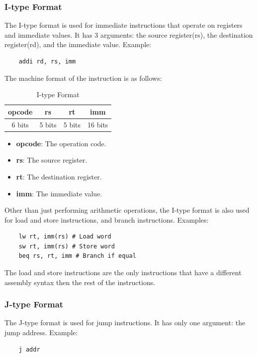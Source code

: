 \subsubsection{I-type Format}
The I-type format is used for immediate instructions that operate on registers and immediate values. It has 3 arguments: the source register(rs), the destination register(rd), and the immediate value. Example:
\begin{verbatim}
    addi rd, rs, imm
\end{verbatim}

The machine format of the instruction is as follows:
\begin{table}[H]
    \centering
    \begin{tabular}{|c|c|c|c|}
    \hline
    \textbf{opcode} & \textbf{rs} & \textbf{rt} & \textbf{imm} \\ \hline
    6 bits         & 5 bits     & 5 bits     & 16 bits     \\ \hline
    \end{tabular}
    \caption{I-type Format}
    \label{tab:i_type_format}
\end{table}

\begin{itemize}
    \item \textbf{opcode}: The operation code.
    \item \textbf{rs}: The source register.
    \item \textbf{rt}: The destination register.
    \item \textbf{imm}: The immediate value.
\end{itemize}
Other than just performing arithmetic operations, the I-type format is also used for load and store instructions, and branch instructions. \newline
Examples:
\begin{verbatim}
    lw rt, imm(rs) # Load word
    sw rt, imm(rs) # Store word
    beq rs, rt, imm # Branch if equal
\end{verbatim}
The load and store instructions are the only instructions that have a different assembly syntax then the rest of the instructions.

\subsubsection{J-type Format}
The J-type format is used for jump instructions. It has only one argument: the jump address. Example:
\begin{verbatim}
    j addr
\end{verbatim}

